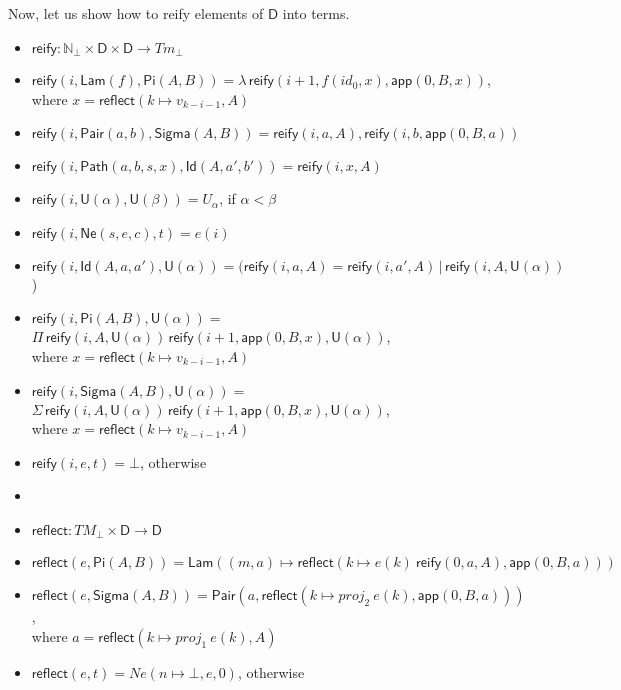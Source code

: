 \documentclass{amsart}
\theoremstyle{definition}
\theoremstyle{remark}
\newcommand{\D}{\mathsf{D}}
\newcommand{\nats}{\mathbb{N}}
\numberwithin{table}{section}
\begin{document}
Now, let us show how to reify elements of $\D$ into terms.
\begin{itemize}
\item[] $\mathsf{reify} : \nats_\bot \times \D \times \D \to Tm_\bot$
\item[] $\mathsf{reify}(i, \mathsf{Lam}(f), \mathsf{Pi}(A, B)) = \lambda\,\mathsf{reify}(i + 1, f(id_0, x), \mathsf{app}(0, B, x))$, \\
        \indent where $x = \mathsf{reflect}(k \mapsto v_{k - i - 1}, A)$
\item[] $\mathsf{reify}(i, \mathsf{Pair}(a, b), \mathsf{Sigma}(A, B)) = \mathsf{reify}(i, a, A), \mathsf{reify}(i, b, \mathsf{app}(0, B, a))$
\item[] $\mathsf{reify}(i, \mathsf{Path}(a, b, s, x), \mathsf{Id}(A, a', b')) = \mathsf{reify}(i, x, A)$
\item[] $\mathsf{reify}(i, \mathsf{U}(\alpha), \mathsf{U}(\beta)) = U_\alpha$, if $\alpha < \beta$
\item[] $\mathsf{reify}(i, \mathsf{Ne}(s, e, c), t) = e(i)$
\item[] $\mathsf{reify}(i, \mathsf{Id}(A, a, a'), \mathsf{U}(\alpha)) = (\mathsf{reify}(i, a, A) = \mathsf{reify}(i, a', A)\,|\,\mathsf{reify}(i, A, \mathsf{U}(\alpha))$)
\item[] $\mathsf{reify}(i, \mathsf{Pi}(A, B), \mathsf{U}(\alpha)) =$
        $\Pi\,\mathsf{reify}(i, A, \mathsf{U}(\alpha))\,\mathsf{reify}(i + 1, \mathsf{app}(0, B, x), \mathsf{U}(\alpha))$, \\
        \indent where $x = \mathsf{reflect}(k \mapsto v_{k - i - 1}, A)$
\item[] $\mathsf{reify}(i, \mathsf{Sigma}(A, B), \mathsf{U}(\alpha)) = $
        $\Sigma\,\mathsf{reify}(i, A, \mathsf{U}(\alpha))\,\mathsf{reify}(i + 1, \mathsf{app}(0, B, x), \mathsf{U}(\alpha))$, \\
        \indent where $x = \mathsf{reflect}(k \mapsto v_{k - i - 1}, A)$
\item[] $\mathsf{reify}(i, e, t) = \bot$, otherwise
\item[]
\item[] $\mathsf{reflect} : TM_\bot \times \D \to \D$
\item[] $\mathsf{reflect}(e,\mathsf{Pi}(A, B)) = \mathsf{Lam}((m, a) \mapsto \mathsf{reflect}(k \mapsto e(k)\ \mathsf{reify}(0, a, A), \mathsf{app}(0, B, a)))$
\item[] $\mathsf{reflect}(e,\mathsf{Sigma}(A, B)) = \mathsf{Pair}(a, \mathsf{reflect}(k \mapsto proj_2\ e(k), \mathsf{app}(0, B, a)))$, \\
        \indent where $a = \mathsf{reflect}(k \mapsto proj_1\ e(k), A)$
\item[] $\mathsf{reflect}(e,t) = Ne(n \mapsto \bot, e, 0)$, otherwise
\end{itemize}



\end{document}
